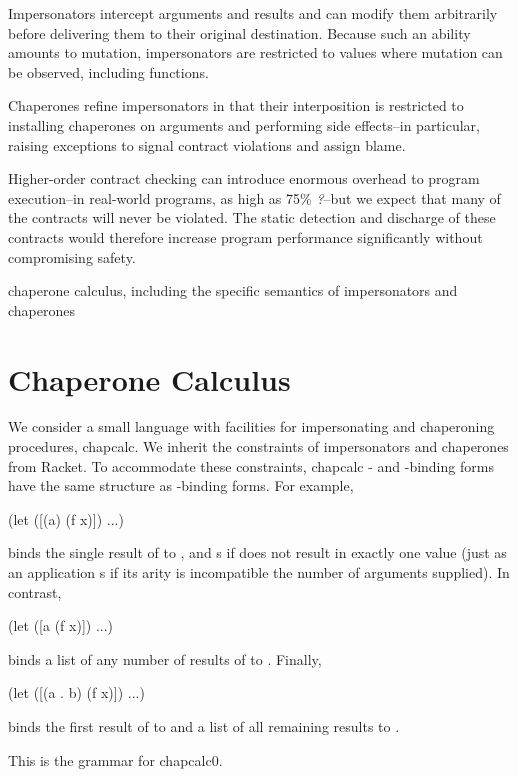 \documentclass{sigplanconf}
\begin{document}
Impersonators intercept arguments and results and can modify them arbitrarily before delivering them to their original destination.
Because such an ability amounts to mutation, impersonators are restricted to values where mutation can be observed, including functions.

Chaperones refine impersonators in that their interposition is restricted to installing chaperones on arguments and performing side effects--in particular, raising exceptions to signal contract violations and assign blame.

Higher-order contract checking can introduce enormous overhead to program execution--in real-world programs, as high as 75\% \emph{?}--but we expect that many of the contracts will never be violated.
The static detection and discharge of these contracts would therefore increase program performance significantly without compromising safety.

chaperone calculus, including the specific semantics of impersonators and chaperones

\section{Chaperone Calculus}

We consider a small language with facilities for impersonating and chaperoning procedures, chapcalc.
We inherit the constraints of impersonators and chaperones from Racket.
To accommodate these constraints, chapcalc - and -binding forms have the same structure as -binding forms.
For example,
\begin{schemedisplay}
(let ([(a) (f x)])
  ...)
\end{schemedisplay}
binds the single result of  to , and s if  does not result in exactly one value (just as an application s if its arity is incompatible the number of arguments supplied).
In contrast,
\begin{schemedisplay}
(let ([a (f x)])
  ...)
\end{schemedisplay}
binds a list of any number of results of  to .
Finally,
\begin{schemedisplay}
(let ([(a . b) (f x)])
  ...)
\end{schemedisplay}
binds the first result of  to  and a list of all remaining results to .

This is the grammar for chapcalc0.

\end{document}
